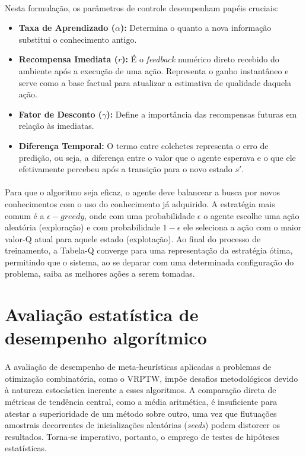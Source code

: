 \paragraph{} Nesta formulação, os parâmetros de controle desempenham papéis cruciais:

\begin{itemize}
    \item \textbf{Taxa de Aprendizado ($\alpha$):} Determina o quanto a nova informação substitui o conhecimento antigo.
    \item \textbf{Recompensa Imediata ($r$):} É o \textit{feedback} numérico direto recebido do ambiente após a execução de uma ação. Representa o ganho instantâneo e serve como a base factual para atualizar a estimativa de qualidade daquela ação.
    \item \textbf{Fator de Desconto ($\gamma$):} Define a importância das recompensas futuras em relação às imediatas.
    \item \textbf{Diferença Temporal:} O termo entre colchetes representa o erro de predição, ou seja, a diferença entre o valor que o agente esperava e o que ele efetivamente percebeu após a transição para o novo estado $s'$.
\end{itemize}

\paragraph{} Para que o algoritmo seja eficaz, o agente deve balancear a busca por novos conhecimentos com o uso do conhecimento já adquirido. A estratégia mais comum é a $\epsilon-greedy$, onde com uma probabilidade $\epsilon$ o agente escolhe uma ação aleatória (exploração) e com probabilidade $1 - \epsilon$ ele seleciona a ação com o maior valor-Q atual para aquele estado (explotação). Ao final do processo de treinamento, a Tabela-Q converge para uma representação da estratégia ótima, permitindo que o sistema, ao se deparar com uma determinada configuração do problema, saiba as melhores ações a serem tomadas.

\section{Avaliação estatística de desempenho algorítmico}
\label{sec:avaliacao_estatistica}

\paragraph{} A avaliação de desempenho de meta-heurísticas aplicadas a problemas de otimização combinatória, como o VRPTW, impõe desafios metodológicos devido à natureza estocástica inerente a esses algoritmos. A comparação direta de métricas de tendência central, como a média aritmética, é insuficiente para atestar a superioridade de um método sobre outro, uma vez que flutuações amostrais decorrentes de inicializações aleatórias (\textit{seeds}) podem distorcer os resultados. Torna-se imperativo, portanto, o emprego de testes de hipóteses estatísticas.

